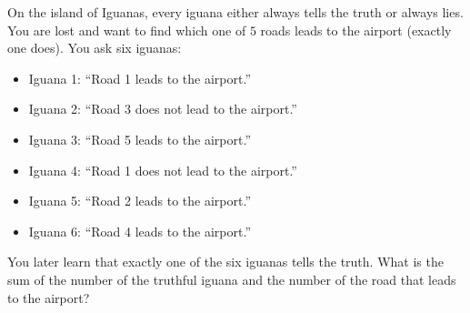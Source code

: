 On the island of Iguanas, every iguana either always tells the truth or always lies. You are lost and want to find which one of $5$ roads leads to the airport (exactly one does). You ask six iguanas:
\begin{itemize}
\item Iguana 1: ``Road 1 leads to the airport.''
\item Iguana 2: ``Road 3 does not lead to the airport.''
\item Iguana 3: ``Road 5 leads to the airport.''
\item Iguana 4: ``Road 1 does not lead to the airport.''
\item Iguana 5: ``Road 2 leads to the airport.''
\item Iguana 6: ``Road 4 leads to the airport.''
\end{itemize}
You later learn that exactly one of the six iguanas tells the truth. What is the sum of the number of the truthful iguana and the number of the road that leads to the airport?
